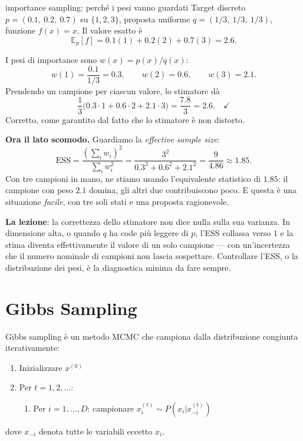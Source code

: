 \begin{esempiosvolto}{importance sampling: perché i pesi vanno guardati}
Target discreto $p = (0.1,\ 0.2,\ 0.7)$ su $\{1,2,3\}$, proposta uniforme $q = (1/3,\ 1/3,\ 1/3)$, funzione $f(x) = x$. Il valore esatto è
\[
\mathbb{E}_p[f] = 0.1(1) + 0.2(2) + 0.7(3) = 2.6.
\]

I pesi di importance sono $w(x) = p(x)/q(x)$:
\[
w(1) = \frac{0.1}{1/3} = 0.3, \qquad w(2) = 0.6, \qquad w(3) = 2.1.
\]
Prendendo un campione per ciascun valore, lo stimatore dà
\[
\frac{1}{3}\big(0.3 \cdot 1 + 0.6 \cdot 2 + 2.1 \cdot 3\big) = \frac{7.8}{3} = 2.6. \quad\checkmark
\]
Corretto, come garantito dal fatto che lo stimatore è non distorto.

\medskip
\textbf{Ora il lato scomodo.} Guardiamo la \emph{effective sample size}:
\[
\mathrm{ESS} = \frac{\left(\sum_i w_i\right)^2}{\sum_i w_i^2} = \frac{3^2}{0.3^2 + 0.6^2 + 2.1^2} = \frac{9}{4.86} \approx 1.85.
\]
Con tre campioni in mano, ne stiamo usando l'equivalente statistico di $1.85$: il campione con peso $2.1$ domina, gli altri due contribuiscono poco. E questa è una situazione \emph{facile}, con tre soli stati e una proposta ragionevole.

\textbf{La lezione}: la correttezza dello stimatore non dice nulla sulla sua varianza. In dimensione alta, o quando $q$ ha code più leggere di $p$, l'ESS collassa verso $1$ e la stima diventa effettivamente il valore di un solo campione — con un'incertezza che il numero nominale di campioni non lascia sospettare. Controllare l'ESS, o la distribuzione dei pesi, è la diagnostica minima da fare sempre.
\end{esempiosvolto}

\section{Gibbs Sampling}

Gibbs sampling è un metodo MCMC che campiona dalla distribuzione congiunta iterativamente:

\begin{theorem}
  \begin{enumerate}
    \item Inizializzare $x^{(0)}$
    \item Per $t = 1, 2, \ldots$:
    \begin{enumerate}
      \item Per $i = 1, \ldots, D$: campionare $x_i^{(t)} \sim P(x_i | x_{-i}^{(t)})$
    \end{enumerate}
  \end{enumerate}
  dove $x_{-i}$ denota tutte le variabili eccetto $x_i$.
\end{theorem}

